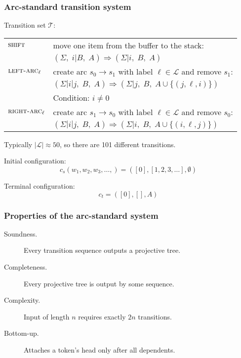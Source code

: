 \documentclass[t]{beamer}
\begin{document}
\begin{frame}
  \frametitle{Arc-standard transition system \cite{nivre2004incrementality}}
  Transition set $\mathcal{T}$:

  \begin{tabular}{ll}
    $\textsc{shift}$ & move one item from the buffer to the stack: \\
    & $(\Sigma, \; i | B, \; A) \Rightarrow (\Sigma | i, \; B, \; A)$ \\
    \hline
    $\textsc{left-arc}_\ell$ & create arc $s_0 \to s_1$ with label $\ell \in \mathcal{L}$ and remove $s_1$: \\
    & $(\Sigma | i|j, \; B, \; A) \Rightarrow (\Sigma | j, \; B, \; A \cup \{(j,\ell,i)\})$ \\
    & Condition: $i\neq0$ \\
    \hline
    $\textsc{right-arc}_\ell$ & create arc $s_1 \to s_0$ with label $\ell \in \mathcal{L}$ and remove $s_0$: \\
    & $(\Sigma | i|j, \; B, \; A) \Rightarrow (\Sigma | i, \; B, \; A \cup \{(i,\ell,j)\})$  
  \end{tabular}
  
  \pause\vfill
  
  Typically $|\mathcal{L}| \approx 50$,
  so there are 101 different transitions.

  \pause\vfill

  Initial configuration:
  \[
    c_s(w_1, w_2, w_3, \ldots,) = ([0], [1, 2, 3, \ldots], \emptyset)
  \]

  Terminal configuration:
  \[
    c_t = ([0], [], A)
  \]
\end{frame}

\begin{frame}
  \frametitle{Properties of the arc-standard system
  }
  \begin{description}
  \item[Soundness.] Every transition sequence outputs a projective tree.
  \item[Completeness.] Every projective tree is output by some sequence.
  \item[Complexity.] Input of length $n$ requires exactly $2n$ transitions.
  \item[Bottom-up.] Attaches a token's head only after all dependents.
  \end{description}
\end{frame}
\end{document}
